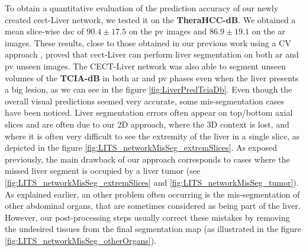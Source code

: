 \documentclass[]{article}
\newcommand{\pplfont}[1]{{\fontfamily{ppl}\selectfont #1}}
\newcommand{\lmttfont}[1]{{\fontfamily{lmtt}\selectfont #1}}
\begin{document}
To obtain a quantitative evaluation of the prediction accuracy of our newly created
\pplfont{\ac{cect}-Liver} network, we tested it on the \textbf{\lmttfont{TheraHCC-dB}}. We
obtained a mean slice-wise \ac{dsc} of $ 90.4 \pm 17.5 $ on the \ac{pv} images and
$ 86.9 \pm 19.1 $ on the \ac{ar} images. These results, close to those obtained
in our previous work using a CV approach \cite{Ouhmich2019}, proved that \pplfont{\ac{cect}-Liver} can perform liver segmentation on both \ac{ar} and \ac{pv} unseen images.
The \pplfont{CECT-Liver} network was also able to segment unseen volumes of the
\textbf{\lmttfont{TCIA-dB}} in both \ac{ar} and \ac{pv} phases even when the liver presents a big lesion, as we can see in the figure \ref{fig:LiverPredTciaDb}.
Even though the overall visual predictions seemed very accurate, some mis-segmentation cases have been noticed. Liver segmentation errors often appear on top/bottom axial slices and are often due to our 2D approach, where the 3D context is lost, and where it is often very difficult to see the extremity of the liver in a single slice, as depicted in the figure \ref{fig:LITS_networkMisSeg_extremSlices}. As exposed previously, the main drawback of our approach corresponds to cases where the missed liver segment is occupied by a liver tumor (see \ref{fig:LITS_networkMisSeg_extremSlices} and \ref{fig:LITS_networkMisSeg_tumor}).
As explained earlier, an other problem often occurring is the mis-segmentation of other abdominal organs, that are sometimes considered as being part of the liver. However, our post-processing steps usually correct these mistakes by removing the undesired tissues from the final segmentation map (as illustrated in the figure \ref{fig:LITS_networkMisSeg_otherOrgans}).
\end{document}
